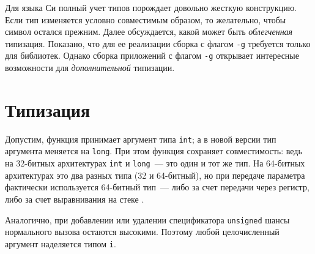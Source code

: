 \documentclass[russian,a4paper,12pt]{article}
\begin{document}
Для языка Си полный учет типов порождает довольно жесткую конструкцию.  Если тип
изменяется условно совместимым образом, то желательно, чтобы символ остался прежним.
Далее обсуждается, какой может быть \textit{облегченная} типизация.  Показано,
что для ее реализации сборка с флагом \verb|-g| требуется только для библиотек.
Однако сборка приложений с флагом \verb|-g| открывает интересные возможности
для \textit{дополнительной} типизации.

\section{Типизация}
Допустим, функция принимает аргумент типа \verb|int|; а в новой версии тип аргумента
меняется на \verb|long|.  При этом функция сохраняет совместимость: ведь на 32-битных
архитектурах \verb|int| и \verb|long|~--- это один и тот же тип.  На 64-битных архитектурах
это два разных типа (32 и 64-битный), но при передаче параметра фактически используется
64-битный тип~--- либо за счет передачи через регистр, либо за счет выравнивания на стеке
\cite[с.\,23]{AMD64ABI}.
\begin{comment}
При этом возникает хороший вопрос: а не будет у нас мусора в старших битах?
По крайней мере на x86-64 мусора не появляется, потому что "mov eax" автоматически
очищает старшие биты.  Проверим, насколько серьезна проблема мусора в других случаях:
\begin{verbatim}
$ cat lib.c
#include <stdio.h>
void func(LIB_TYPE arg) { printf("%ld\n", (long) arg); }
$ cat main.c
extern void func(MAIN_TYPE arg);
int main() { func(666); return 0; }
$ gcc -m32 -DMAIN_TYPE=short -DLIB_TYPE=int -O main.c lib.c && ./a.out
666
\end{verbatim}
Вроде нету мусора.
\end{comment}
Аналогично, при добавлении или удалении спецификатора \verb|unsigned|
шансы нормального вызова остаются высокими.  Поэтому любой целочисленный
аргумент наделяется типом \verb|i|.
\end{document}
